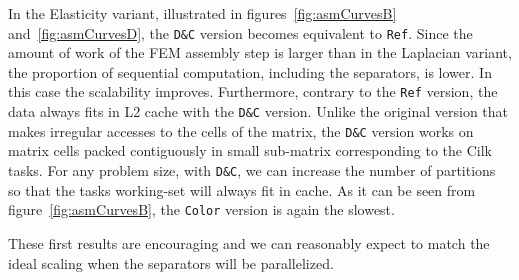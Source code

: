 \documentclass[10pt]{IOS-Book-Article}
\begin{document}
In the Elasticity variant, illustrated in figures~\ref{fig:asmCurvesB} and~\ref{fig:asmCurvesD}, the {\tt D\&C} version becomes equivalent to {\tt Ref}.
Since the amount of work of the FEM assembly step is larger than in the Laplacian variant, the proportion of sequential computation, including the separators, is lower.
In this case the scalability improves. Furthermore, contrary to the {\tt Ref} version, the data always fits in L2 cache with the {\tt D\&C} version.
Unlike the original version that makes irregular accesses to the cells of the matrix, the {\tt D\&C} version works on matrix cells packed contiguously in small sub-matrix corresponding to the Cilk tasks.
For any problem size, with {\tt D\&C}, we can increase the number of partitions so that the tasks working-set will always fit in cache.
As it can be seen from figure~\ref{fig:asmCurvesB}, the {\tt Color} version is again the slowest.

These first results are encouraging and we can reasonably expect to match the ideal scaling when the separators will be parallelized.
\end{document}
